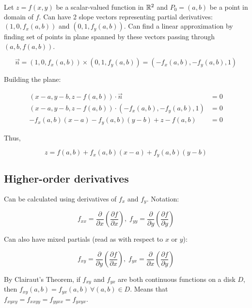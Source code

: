 Let $z=f(x,y)$ be a scalar-valued function in $\mathbb{R}^2$ and $P_0=(a,b)$ be a point in domain of $f$. Can have 2 slope vectors representing partial derivatives:
$(1,0,f_x(a,b))$ and $(0,1,f_y(a,b))$. Can find a linear approximation by finding set of points in plane spanned by these vectors passing through
$(a,b,f(a,b))$.

\[\vec{n}=(1,0,f_x(a,b))\times(0,1,f_y(a,b))=(-f_x(a,b),-f_y(a,b),1)\]

Building the plane:

\begin{align*}
    (x-a, y-b, z-f(a, b)) \cdot \vec{n} &=0 \\
    (x-a, y-b, z-f(a, b)) \cdot\left(-f_{x}(a, b),-f_{y}(a, b), 1\right) &=0 \\
    -f_{x}(a, b)(x-a)-f_{y}(a, b)(y-b)+z-f(a, b) &=0
\end{align*}

Thus,

\[z=f(a, b)+f_{x}(a, b)(x-a)+f_{y}(a, b)(y-b)\]

\subsection{Higher-order derivatives}

Can be calculated using derivatives of $f_x$ and $f_y$. Notation:

\[f_{xx}=\frac{\partial}{\partial x}(\frac{\partial f}{\partial x}),\; f_{yy}=\frac{\partial}{\partial y}(\frac{\partial f}{\partial y})\]

Can also have mixed partials (read as with respect to $x$ or $y$):

\[f_{xy}=\frac{\partial}{\partial y}(\frac{\partial f}{\partial x}),\; f_{yx}=\frac{\partial}{\partial x}(\frac{\partial f}{\partial y})\]

By Clairaut's Theorem, if $f_{xy}$ and $f_{yx}$ are both continuous functions on a disk $D$, then $f_{xy}(a,b)=f_{yx}(a,b)\: \forall (a,b)\in D$. Means that $f_{xyxy}=f_{xxyy}=f_{yyxx}=f_{yxyx}$.